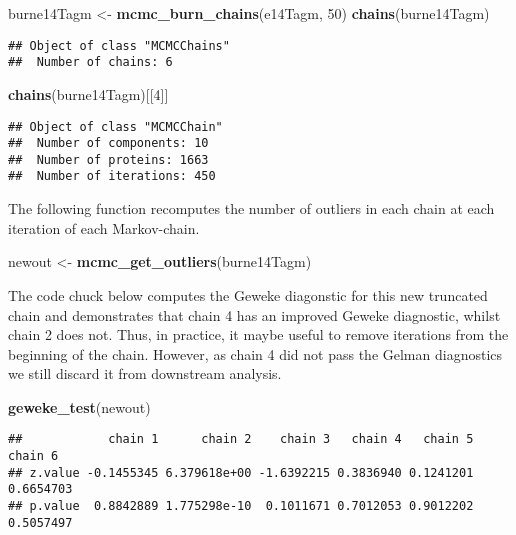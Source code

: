 \documentclass[]{article}
\newenvironment{Shaded}{\begin{snugshade}}{\end{snugshade}}
\newcommand{\KeywordTok}[1]{\textcolor[rgb]{0.13,0.29,0.53}{\textbf{{#1}}}}
\newcommand{\DecValTok}[1]{\textcolor[rgb]{0.00,0.00,0.81}{{#1}}}
\newcommand{\StringTok}[1]{\textcolor[rgb]{0.31,0.60,0.02}{{#1}}}
\newcommand{\NormalTok}[1]{{#1}}
\begin{document}
\begin{Shaded}
\begin{Highlighting}[]
\NormalTok{burne14Tagm <-}\StringTok{ }\KeywordTok{mcmc_burn_chains}\NormalTok{(e14Tagm, }\DecValTok{50}\NormalTok{)}
\KeywordTok{chains}\NormalTok{(burne14Tagm)}
\end{Highlighting}
\end{Shaded}

\begin{verbatim}
## Object of class "MCMCChains"
##  Number of chains: 6
\end{verbatim}

\begin{Shaded}
\begin{Highlighting}[]
\KeywordTok{chains}\NormalTok{(burne14Tagm)[[}\DecValTok{4}\NormalTok{]]}
\end{Highlighting}
\end{Shaded}

\begin{verbatim}
## Object of class "MCMCChain"
##  Number of components: 10 
##  Number of proteins: 1663 
##  Number of iterations: 450
\end{verbatim}

The following function recomputes the number of outliers in each chain
at each iteration of each Markov-chain.

\begin{Shaded}
\begin{Highlighting}[]
\NormalTok{newout <-}\StringTok{ }\KeywordTok{mcmc_get_outliers}\NormalTok{(burne14Tagm)}
\end{Highlighting}
\end{Shaded}

The code chuck below computes the Geweke diagonstic for this new
truncated chain and demonstrates that chain 4 has an improved Geweke
diagnostic, whilst chain 2 does not. Thus, in practice, it maybe useful
to remove iterations from the beginning of the chain. However, as chain
4 did not pass the Gelman diagnostics we still discard it from
downstream analysis.

\begin{Shaded}
\begin{Highlighting}[]
\KeywordTok{geweke_test}\NormalTok{(newout)}
\end{Highlighting}
\end{Shaded}

\begin{verbatim}
##            chain 1      chain 2    chain 3   chain 4   chain 5   chain 6
## z.value -0.1455345 6.379618e+00 -1.6392215 0.3836940 0.1241201 0.6654703
## p.value  0.8842889 1.775298e-10  0.1011671 0.7012053 0.9012202 0.5057497
\end{verbatim}
\end{document}

